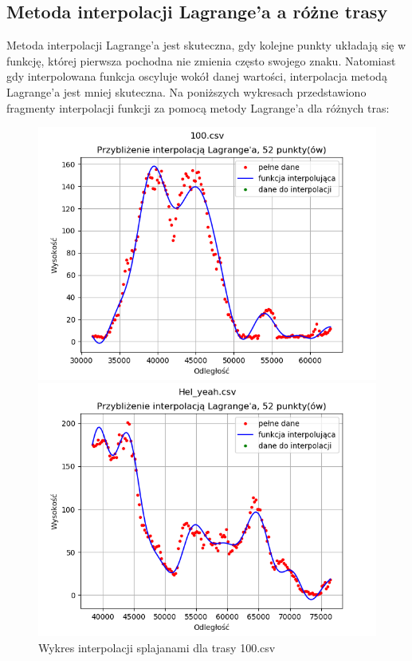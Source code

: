 \documentclass{article} %
\begin{document}
\subsection{Metoda interpolacji Lagrange'a a różne trasy}
Metoda interpolacji Lagrange'a jest skuteczna, gdy kolejne punkty układają się
w funkcję, której pierwsza pochodna nie zmienia często swojego znaku. Natomiast gdy 
interpolowana funkcja oscyluje wokół danej wartości, interpolacja metodą Lagrange'a
 jest mniej skuteczna. Na poniższych wykresach przedstawiono fragmenty interpolacji funkcji
 za pomocą metody Lagrange'a dla różnych tras:\\
\begin{figure}[h!]
    \center
    \begin{minipage}[b]{0.4\textwidth}
        \includegraphics[width=\textwidth]{lagrange/rozne_trasy/100_52punkty_cale.png}
        \caption{Wykres interpolacji splajanami dla trasy 100.csv}
    \end{minipage}
    \hfill
    \begin{minipage}[b]{0.4\textwidth}
        \includegraphics[width=\textwidth]{lagrange/rozne_trasy/hy_52punkty_cale.png}

\end{minipage}
\end{figure}
\end{document}
